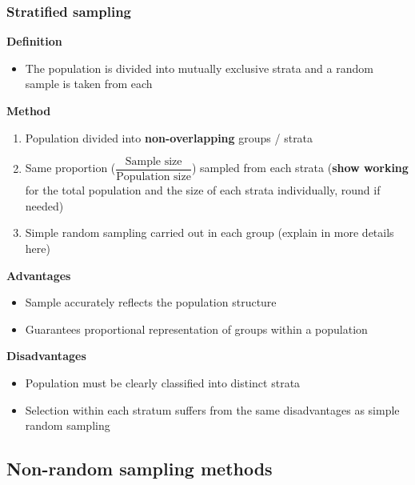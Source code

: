 \documentclass[fleqn, 11pt]{article}
\begin{document}
	\subsubsection{Stratified sampling}
	\textbf{Definition}
	\begin{itemize}
		\item The population is divided into mutually exclusive strata and a random sample is taken from each
	\end{itemize}
	\textbf{Method}
	\begin{enumerate}
		\item Population divided into \textbf{non-overlapping} groups / strata
		\item Same proportion ($\dfrac{\text{Sample size}}{\text{Population size}}$) sampled from each strata (\textbf{show working} for the total population and the size of each strata individually, round if needed)
		\item Simple random sampling carried out in each group (explain in more details here)
	\end{enumerate}
	\textbf{Advantages}
	\begin{itemize}
		\item Sample accurately reflects the population structure
		\item Guarantees proportional representation of groups within a population
	\end{itemize}
	\textbf{Disadvantages}
	\begin{itemize}
		\item Population must be clearly classified into distinct strata
		\item Selection within each stratum suffers from the same disadvantages as simple random sampling
	\end{itemize}
	\subsection{Non-random sampling methods}
\end{document}
